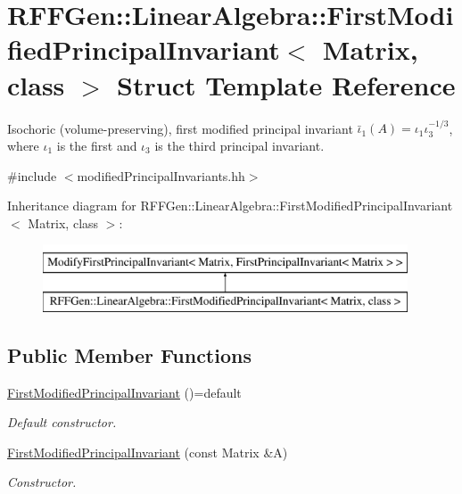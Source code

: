 \hypertarget{structRFFGen_1_1LinearAlgebra_1_1FirstModifiedPrincipalInvariant}{\section{R\-F\-F\-Gen\-:\-:Linear\-Algebra\-:\-:First\-Modified\-Principal\-Invariant$<$ Matrix, class $>$ Struct Template Reference}
\label{structRFFGen_1_1LinearAlgebra_1_1FirstModifiedPrincipalInvariant}
}


Isochoric (volume-\/preserving), first modified principal invariant $ \bar\iota_1(A)=\iota_1\iota_3^{-1/3} $, where $\iota_1$ is the first and $\iota_3$ is the third principal invariant.  




{\ttfamily \#include $<$modified\-Principal\-Invariants.\-hh$>$}

Inheritance diagram for R\-F\-F\-Gen\-:\-:Linear\-Algebra\-:\-:First\-Modified\-Principal\-Invariant$<$ Matrix, class $>$\-:\begin{figure}[H]
\begin{center}
\leavevmode
\includegraphics[height=2.000000cm]{structRFFGen_1_1LinearAlgebra_1_1FirstModifiedPrincipalInvariant}
\end{center}
\end{figure}
\subsection*{Public Member Functions}
\begin{DoxyCompactItemize}
\item 
\hypertarget{structRFFGen_1_1LinearAlgebra_1_1FirstModifiedPrincipalInvariant_a9bac4f0c2ec989db534c94378a0b48f3}{\hyperlink{structRFFGen_1_1LinearAlgebra_1_1FirstModifiedPrincipalInvariant_a9bac4f0c2ec989db534c94378a0b48f3}{First\-Modified\-Principal\-Invariant} ()=default}\label{structRFFGen_1_1LinearAlgebra_1_1FirstModifiedPrincipalInvariant_a9bac4f0c2ec989db534c94378a0b48f3}

\begin{DoxyCompactList}\small\item\em Default constructor. \end{DoxyCompactList}\item 
\hyperlink{structRFFGen_1_1LinearAlgebra_1_1FirstModifiedPrincipalInvariant_a241d5c718a2648527fc1dddf1bc9349b}{First\-Modified\-Principal\-Invariant} (const Matrix \&A)
\begin{DoxyCompactList}\small\item\em Constructor. \end{DoxyCompactList}\end{DoxyCompactItemize}


